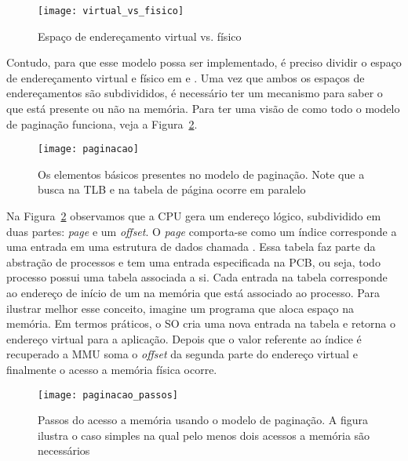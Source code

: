 \begin{figure}[!h]
  \centering
  \texttt{[image: virtual\_vs\_fisico]} 
  \caption{Espaço de endereçamento virtual vs. físico}
  \label{fig:vas_pas}
\end{figure}

 Contudo, para que esse modelo possa ser implementado, é
preciso dividir o espaço de endereçamento virtual e físico em
 e . Uma vez que ambos os espaços de
endereçamentos são subdivididos, é necessário ter um mecanismo para saber o que
está presente ou não na memória. Para ter uma visão de como todo o modelo de
paginação funciona, veja a Figura~\ref{fig:paginacao}.

\begin{figure}[!h]
  \centering
  \texttt{[image: paginacao]} 
  \caption{Os elementos básicos presentes no modelo de paginação. Note que a busca na TLB e na tabela de página ocorre em paralelo}
  \label{fig:paginacao}
\end{figure}

Na Figura~\ref{fig:paginacao} observamos que a CPU gera um endereço lógico,
subdividido em duas partes: \textit{page} e um \textit{offset}. O \emph{page}
comporta-se como um índice corresponde a uma entrada em uma estrutura de dados
chamada . Essa tabela faz parte da abstração
de processos e tem uma entrada especificada na PCB, ou seja, todo processo
possui uma tabela associada a si. Cada entrada na tabela corresponde ao
endereço de início de um  na memória que está associado ao
processo.  Para ilustrar melhor esse conceito, imagine um programa que aloca
espaço na memória. Em termos práticos, o SO cria uma nova entrada na tabela e
retorna o endereço virtual para a aplicação.  Depois que o valor referente ao
índice é recuperado a MMU soma o \textit{offset} da segunda parte do endereço
virtual e finalmente o acesso a memória física ocorre.

\begin{figure}[!h]
  \centering
  \texttt{[image: paginacao\_passos]} 
  \caption{Passos do acesso a memória usando o modelo de paginação. A figura ilustra o caso simples na qual pelo menos dois acessos a memória são necessários}
  \label{fig:passos_paginacao}
\end{figure}


